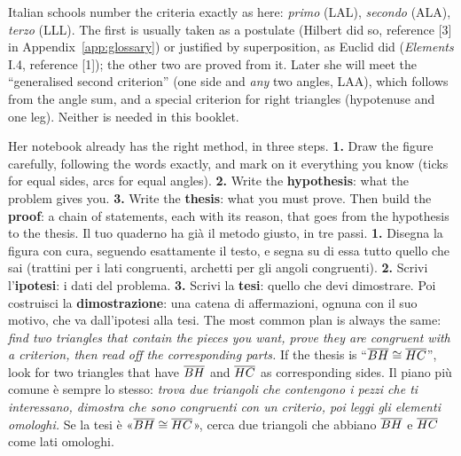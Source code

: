 \begin{tutor}
Italian schools number the criteria exactly as here: \emph{primo} (LAL), \emph{secondo} (ALA), \emph{terzo} (LLL). The first is usually taken as a postulate (Hilbert did so, reference [3] in Appendix~\ref{app:glossary}) or justified by superposition, as Euclid did (\emph{Elements} I.4, reference [1]); the other two are proved from it. Later she will meet the ``generalised second criterion'' (one side and \emph{any} two angles, LAA), which follows from the angle sum, and a special criterion for right triangles (hypotenuse and one leg). Neither is needed in this booklet.
\end{tutor}

\label{sec:howto}
\begin{bi}
Her notebook already has the right method, in three steps. \textbf{1.} Draw the figure carefully, following the words exactly, and mark on it everything you know (ticks for equal sides, arcs for equal angles). \textbf{2.} Write the \textbf{hypothesis}: what the problem gives you. \textbf{3.} Write the \textbf{thesis}: what you must prove. Then build the \textbf{proof}: a chain of statements, each with its reason, that goes from the hypothesis to the thesis.
\IT
Il tuo quaderno ha già il metodo giusto, in tre passi. \textbf{1.} Disegna la figura con cura, seguendo esattamente il testo, e segna su di essa tutto quello che sai (trattini per i lati congruenti, archetti per gli angoli congruenti). \textbf{2.} Scrivi l'\textbf{ipotesi}: i dati del problema. \textbf{3.} Scrivi la \textbf{tesi}: quello che devi dimostrare. Poi costruisci la \textbf{dimostrazione}: una catena di affermazioni, ognuna con il suo motivo, che va dall'ipotesi alla tesi.
\EN
The most common plan is always the same: \emph{find two triangles that contain the pieces you want, prove they are congruent with a criterion, then read off the corresponding parts.} If the thesis is ``$\overline{BH} \cong \overline{HC}$'', look for two triangles that have $\overline{BH}$ and $\overline{HC}$ as corresponding sides.
\IT
Il piano più comune è sempre lo stesso: \emph{trova due triangoli che contengono i pezzi che ti interessano, dimostra che sono congruenti con un criterio, poi leggi gli elementi omologhi.} Se la tesi è «$\overline{BH} \cong \overline{HC}$», cerca due triangoli che abbiano $\overline{BH}$ e $\overline{HC}$ come lati omologhi.
\end{bi}

